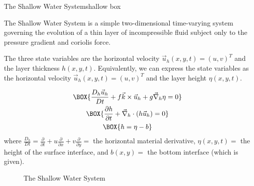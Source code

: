 \begin{fact}{The Shallow Water System}{shallow box}\label{shallow box}

    The Shallow Water System is a simple two-dimensional time-varying system governing the evolution of a thin layer of incompressible fluid subject only to the pressure gradient and coriolis force.

    The three state variables are the horizontal velocity $\vec{u}_h(x,y,t)=(u,v)^T$ and the layer thickness $h(x,y,t)$. Equivalently, we can express the state variables as the horizontal velocity $\vec{u}_h(x,y,t)=(u,v)^T$ and the layer height $\eta(x,y,t)$.

    \begin{minipage}{.5\linewidth}
    \begin{gather}
        \label{SW mom}
        \BOX{\frac{D_h\vec{u}_h}{Dt}+f\vec{k}\times\vec{u}_h+g\vec{\nabla}_h\eta=0}\\
        \label{SW mass}
        \BOX{\frac{\partial h}{\partial t}+\vec{\nabla}_h\cdot(h\vec{u}_h)=0}\\
        \label{SW height}
        \BOX{h=\eta-b}
    \end{gather}
    where $\frac{D_h}{Dt}=\frac{\partial}{\partial t}+u\frac{\partial}{\partial x}+v\frac{\partial}{\partial y}=$ the horizontal material derivative, $\eta(x,y,t)=$ the height of the surface interface, and $b(x,y)=$ the bottom interface (which is given).
    \end{minipage}
    \hfill
    \begin{minipage}{.48\linewidth}
    \begin{figure}[H]
        \centering
        \caption{The Shallow Water System}
    \end{figure}
    \end{minipage}
\end{fact}

